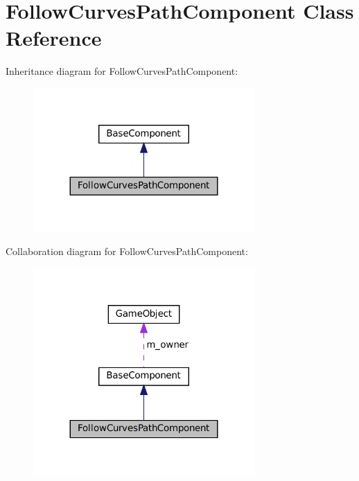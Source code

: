 \hypertarget{classFollowCurvesPathComponent}{}\section{Follow\+Curves\+Path\+Component Class Reference}
\label{classFollowCurvesPathComponent}


Inheritance diagram for Follow\+Curves\+Path\+Component\+:
\nopagebreak
\begin{figure}[H]
\begin{center}
\leavevmode
\includegraphics[width=239pt]{classFollowCurvesPathComponent__inherit__graph}
\end{center}
\end{figure}


Collaboration diagram for Follow\+Curves\+Path\+Component\+:
\nopagebreak
\begin{figure}[H]
\begin{center}
\leavevmode
\includegraphics[width=239pt]{classFollowCurvesPathComponent__coll__graph}
\end{center}
\end{figure}
